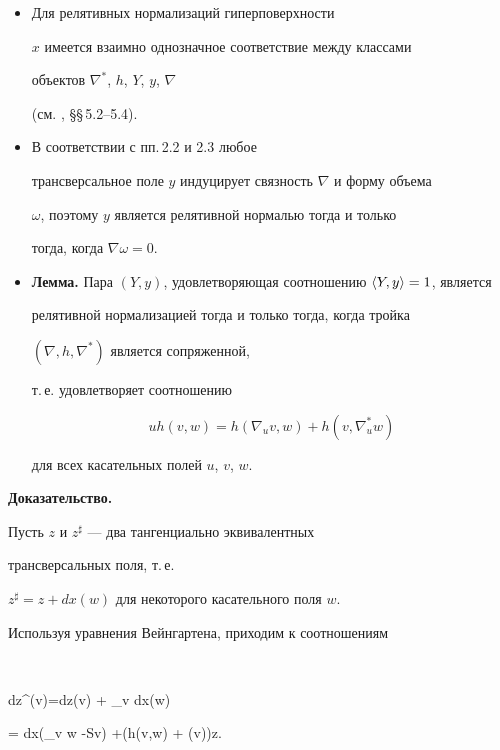 \begin{itemize}
\item[(iv)]


Для релятивных нормализаций гиперповерхности


$x$ имеется взаимно однозначное соответствие между классами


объектов $\nabla^*$, $h$, $Y$, $y$, $\nabla$


(см. \cite{SIM-S-V}, \S\S\,5.2--5.4).





\item[(v)]


В соответствии с пп.\,2.2 и 2.3 любое


трансверсальное поле $y$ индуцирует связность $\nabla$ и форму объема


$\omega$, поэтому $y$ является релятивной нормалью тогда и только


тогда, когда $\nabla \omega = 0$.





\item[(vi)]


{\bf Лемма.} Пара $(Y,y)$, удовлетворяющая соотношению $\langle Y,y\rangle =1$, является


релятивной нормализацией тогда и только тогда, когда тройка


$(\nabla, h, \nabla^*)$ является сопряженной,


т.\,е. удовлетворяет соотношению


$$


u h(v,w) = h(\nabla_u v,w) + h(v, \nabla^*_u w)


$$


для всех касательных полей $u$, $v$, $w$.


\end{itemize}





{\bf Доказательство.}


Пусть $z$ и $z^\sharp$ --- два тангенциально эквивалентных


трансверсальных поля, т.\,е.


$z^\sharp=z + dx(w)$ для некоторого касательного поля $w$.


Используя уравнения Вейнгартена, приходим к соотношениям


$$


dz^\sharp(v)=dz(v) + \ov{\nabla} _v dx(w)


= dx(\nabla _v w -Sv) +(h(v,w) + \tau (v))z.


